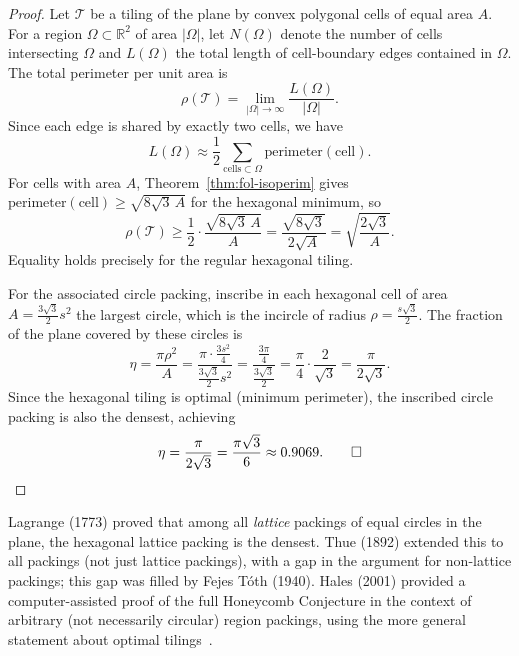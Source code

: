 \begin{proof}
Let \(\mathcal{T}\) be a tiling of the plane by convex polygonal cells
of equal area \(A\).  For a region \(\Omega\subset\mathbb{R}^2\) of area
\(|\Omega|\), let \(N(\Omega)\) denote the number of cells intersecting
\(\Omega\) and \(L(\Omega)\) the total length of cell-boundary edges
contained in \(\Omega\).  The total perimeter per unit area is
\[
  \rho(\mathcal{T}) = \lim_{|\Omega|\to\infty}\frac{L(\Omega)}{|\Omega|}.
\]
Since each edge is shared by exactly two cells, we have
\[
  L(\Omega) \approx \frac{1}{2}\sum_{\text{cells}\subset\Omega}
  \text{perimeter}(\text{cell}).
\]
For cells with area \(A\), Theorem~\ref{thm:fol-isoperim} gives
\(\text{perimeter}(\text{cell}) \ge \sqrt{8\sqrt{3}\,A}\) for the
hexagonal minimum, so
\[
  \rho(\mathcal{T}) \ge \frac{1}{2}\cdot\frac{\sqrt{8\sqrt{3}\,A}}{A}
                      = \frac{\sqrt{8\sqrt{3}}}{2\sqrt{A}}
                      = \sqrt{\frac{2\sqrt{3}}{A}}.
\]
Equality holds precisely for the regular hexagonal tiling.

For the associated circle packing, inscribe in each hexagonal cell of
area \(A = \frac{3\sqrt{3}}{2}s^2\) the largest circle, which is the
incircle of radius \(\rho = \frac{s\sqrt{3}}{2}\).  The fraction of the
plane covered by these circles is
\[
  \eta = \frac{\pi\rho^2}{A}
       = \frac{\pi\cdot\frac{3s^2}{4}}{\frac{3\sqrt{3}}{2}s^2}
       = \frac{\frac{3\pi}{4}}{\frac{3\sqrt{3}}{2}}
       = \frac{\pi}{4}\cdot\frac{2}{\sqrt{3}}
       = \frac{\pi}{2\sqrt{3}}.
\]
Since the hexagonal tiling is optimal (minimum perimeter), the inscribed
circle packing is also the densest, achieving
\[
  \eta = \frac{\pi}{2\sqrt{3}} = \frac{\pi\sqrt{3}}{6} \approx 0.9069.
\qed
\]
\end{proof}

\begin{remark}
Lagrange (1773) proved that among all \emph{lattice} packings of equal
circles in the plane, the hexagonal lattice packing is the densest.
Thue (1892) extended this to all packings (not just lattice packings),
with a gap in the argument for non-lattice packings; this gap was
filled by Fejes Tóth (1940).  Hales (2001) provided a
computer-assisted proof of the full Honeycomb Conjecture in the context
of arbitrary (not necessarily circular) region packings, using the
more general statement about optimal tilings~\cite{hales_honeycomb,conway_sphere_packings}.
\end{remark}

